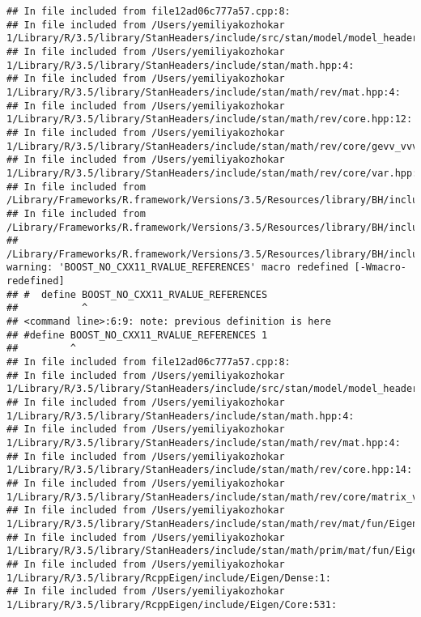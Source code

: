 \documentclass[]{article}
\begin{document}
\begin{verbatim}
## In file included from file12ad06c777a57.cpp:8:
## In file included from /Users/yemiliyakozhokar 1/Library/R/3.5/library/StanHeaders/include/src/stan/model/model_header.hpp:4:
## In file included from /Users/yemiliyakozhokar 1/Library/R/3.5/library/StanHeaders/include/stan/math.hpp:4:
## In file included from /Users/yemiliyakozhokar 1/Library/R/3.5/library/StanHeaders/include/stan/math/rev/mat.hpp:4:
## In file included from /Users/yemiliyakozhokar 1/Library/R/3.5/library/StanHeaders/include/stan/math/rev/core.hpp:12:
## In file included from /Users/yemiliyakozhokar 1/Library/R/3.5/library/StanHeaders/include/stan/math/rev/core/gevv_vvv_vari.hpp:5:
## In file included from /Users/yemiliyakozhokar 1/Library/R/3.5/library/StanHeaders/include/stan/math/rev/core/var.hpp:7:
## In file included from /Library/Frameworks/R.framework/Versions/3.5/Resources/library/BH/include/boost/math/tools/config.hpp:13:
## In file included from /Library/Frameworks/R.framework/Versions/3.5/Resources/library/BH/include/boost/config.hpp:39:
## /Library/Frameworks/R.framework/Versions/3.5/Resources/library/BH/include/boost/config/compiler/clang.hpp:200:11: warning: 'BOOST_NO_CXX11_RVALUE_REFERENCES' macro redefined [-Wmacro-redefined]
## #  define BOOST_NO_CXX11_RVALUE_REFERENCES
##           ^
## <command line>:6:9: note: previous definition is here
## #define BOOST_NO_CXX11_RVALUE_REFERENCES 1
##         ^
## In file included from file12ad06c777a57.cpp:8:
## In file included from /Users/yemiliyakozhokar 1/Library/R/3.5/library/StanHeaders/include/src/stan/model/model_header.hpp:4:
## In file included from /Users/yemiliyakozhokar 1/Library/R/3.5/library/StanHeaders/include/stan/math.hpp:4:
## In file included from /Users/yemiliyakozhokar 1/Library/R/3.5/library/StanHeaders/include/stan/math/rev/mat.hpp:4:
## In file included from /Users/yemiliyakozhokar 1/Library/R/3.5/library/StanHeaders/include/stan/math/rev/core.hpp:14:
## In file included from /Users/yemiliyakozhokar 1/Library/R/3.5/library/StanHeaders/include/stan/math/rev/core/matrix_vari.hpp:4:
## In file included from /Users/yemiliyakozhokar 1/Library/R/3.5/library/StanHeaders/include/stan/math/rev/mat/fun/Eigen_NumTraits.hpp:4:
## In file included from /Users/yemiliyakozhokar 1/Library/R/3.5/library/StanHeaders/include/stan/math/prim/mat/fun/Eigen.hpp:4:
## In file included from /Users/yemiliyakozhokar 1/Library/R/3.5/library/RcppEigen/include/Eigen/Dense:1:
## In file included from /Users/yemiliyakozhokar 1/Library/R/3.5/library/RcppEigen/include/Eigen/Core:531:

\end{verbatim}
\end{document}
